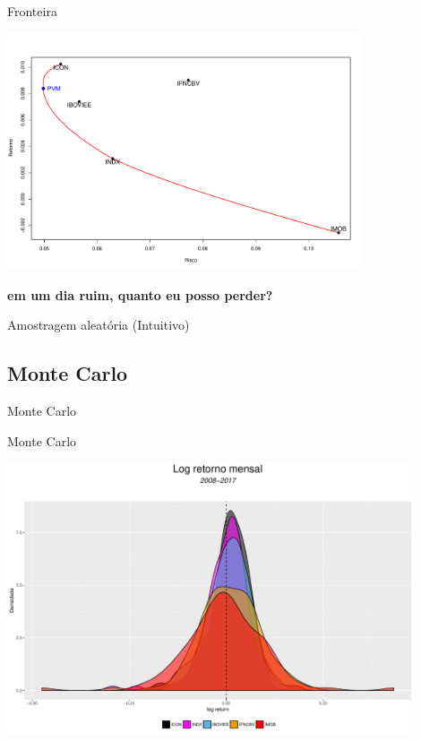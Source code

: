 \documentclass{beamer}
\begin{document}
\begin{frame}{Fronteira}

\begin{center}
 \includegraphics[height=7cm,keepaspectratio]{fronteira_ativos.pdf}
 \end{center}
 
 \pause


\textbf{em um dia ruim, quanto eu posso perder?} 


\end{frame}




\begin{frame}{ }
    \begin{block}{ }
      \Huge  Amostragem aleatória (Intuitivo)
    \end{block}
\end{frame}




\subsection{Monte Carlo }

\begin{frame}{ }
    \begin{block}{ }
      \Huge  Monte Carlo
    \end{block}
\end{frame}

\begin{frame}{Monte Carlo}

\begin{center}
 \includegraphics[height=8cm,keepaspectratio]{decritiva_indices.pdf}
 \end{center}

\end{frame}
\end{document}
